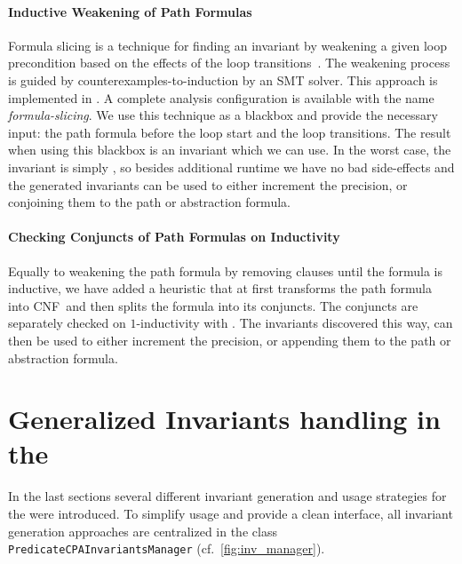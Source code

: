 \paragraph{Inductive Weakening of Path Formulas}
Formula slicing is a technique for finding an invariant by weakening a given loop precondition based on the effects of the loop transitions~\cite{Karpenkov:Slicing}. The weakening process is guided by 
counterexamples-to-induction by an \ac{SMT} solver. This approach is implemented in \CPAchecker{}. A complete analysis configuration is available with the name \emph{formula-slicing}. We use this 
technique as a blackbox and provide the necessary input: the path formula before the loop start and the loop transitions. The result when using this blackbox is an invariant which we can use. In 
the worst case, the invariant is simply \true{}, so besides additional runtime we have no bad side-effects and the generated invariants can be used to either increment the precision, or conjoining 
them to the path or abstraction formula.


\paragraph{Checking Conjuncts of Path Formulas on Inductivity}
Equally to weakening the path formula by removing clauses until the formula is inductive, we have added a heuristic that at first transforms the path formula into \ac{CNF}\, and then splits 
the formula into its conjuncts. The conjuncts are separately checked on $1$-inductivity with \Kinduction{}. The invariants discovered this way, can then be used to either increment the precision, or 
appending them to the path or abstraction formula.


\section{Generalized Invariants handling in the \mbox{\PredicateCPA{}}}
In the last sections several different invariant generation and usage strategies for the \PredicateCPA{} were introduced. To simplify usage and provide a clean interface, all invariant generation 
approaches are centralized in the class \texttt{PredicateCPAInvariantsManager} (cf.~\autoref{fig:inv_manager}). 

